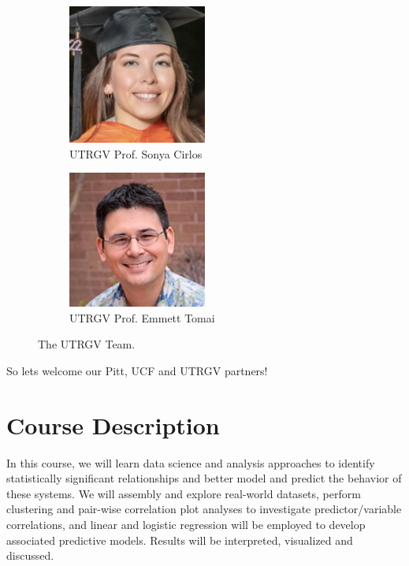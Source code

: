 \documentclass[10pt]{article} %
\begin{document}
    \begin{figure}[htbp]
      \centering
      \begin{subfigure}{0.3\linewidth}
        \centering
        \includegraphics[width=0.5\textwidth]{figs/SonyaCirlos-crop.jpeg}
        \caption{UTRGV Prof. Sonya Cirlos}
        \label{fig:sonya}
      \end{subfigure}
      \hfill
      \begin{subfigure}{0.3\linewidth}
        \centering
        \includegraphics[width=0.5\textwidth]{figs/emmett-tomai-cr.jpg}
        \caption{UTRGV Prof. Emmett Tomai}
        \label{fig:emmett}
      \end{subfigure}
      \caption{The UTRGV Team. }
      \label{fig:UTRGV}
    \end{figure}

    So lets welcome our Pitt, UCF and UTRGV partners!



\section{Course Description}

  In this course, we will learn data science and analysis approaches to identify statistically significant relationships and better model and predict the behavior of these systems.
  We will assembly and explore real-world datasets, perform clustering and pair-wise correlation plot analyses to investigate predictor/variable correlations, and linear and logistic regression will be employed to develop associated predictive models.
  Results will be interpreted, visualized and discussed.
\end{document}
